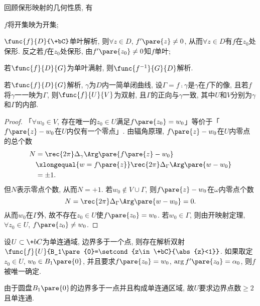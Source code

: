 \documentclass{ctexart}
\begin{document}
\begin{remark}
    回顾保形映射的几何性质, 有
    \begin{cenum}
        \item $f$将开集映为开集;
        \item $\func{f}{D}{\+bC}$单叶解析, 则$\forall z\in D$, $f'\pare{z}\neq 0$, 从而$\forall z\in D$有$f$在$z_0$处保形. 反之若$f$在$z_0$处保形, 由$f'\pare{z_0}\neq 0$知$f$单叶;
        \item 若$\func{f}{D}{G}$为单叶满射, 则$\func{f^{-1}}{G}{D}$解析.
    \end{cenum}
\end{remark}
\begin{proposition}
    若$\func{f}{D}{G}$解析, $\gamma$为$D$内一简单闭曲线, 设$\Gamma = f\comp \gamma$是$\gamma$在$f$下的像, 且若$f$将$\gamma$一一映为$\Gamma$, 则$\func{f}{U}{V}$为双射, 且$\Gamma$的正向与$\gamma$一致, 其中$U$和$V$分别为$\gamma$和$\Gamma$的内部.
\end{proposition}
\begin{figure}[ht]
    \centering
\end{figure}
\begin{proof}
    「$\forall w_0 \in V$, 存在唯一的$z_0 \in U$满足$f\pare{z_0} = w_0$」等价于「$f\pare{z} - w_0$在$U$内仅有一个零点」. 由辐角原理, $f\pare{z} - w_0$在$U$内零点的总个数
    \begin{align*}
        N &= \rec{2\pi}\Delta_\gamma \Arg\pare{f\pare{z} - w_0} \\
        &\xlongequal{w=f\pare{z}} \rec{2\pi} \Delta_\Gamma \Arg\pare{w-w_0} \\
        &= \pm 1.
    \end{align*}
    但$N$表示零点个数, 从而$N = +1$. 若$w_0\notin V\cup \Gamma$, 则$f\pare{z}  - w_0$在$\omega$内零点个数
    \[ N = \rec{2\pi} \Delta_\Gamma \Arg\pare{w-w_0} = 0. \]
    从而$w_0$在$\Gamma$外, 故不存在$z_0\in U$使$f\pare{z_0}=w_0$. 若$w_0\in \Gamma$, 则由开映射定理, $\forall z_0\in U$, $f\pare{z_0}\neq w_0$.
\end{proof}
\begin{theorem}[Riemann映射定理]
    设$U\subset \+bC$为单连通域, 边界多于一个点, 则存在解析双射$\func{f}{U}{B_1\pare{0}=\setcond{z\in\+bC}{\abs{z}<1}}$. 如果取定$z_0 \in U$, $w_0 \in B_1\pare{0}$, 并且要求$f\pare{z_0} = w_0$, $\arg f'\pare{z_0} = \alpha_0$, 则$f$被唯一确定.
\end{theorem}
\begin{remark}
    由于圆盘$B_1\pare{0}$的边界多于一点并且构成单连通区域, 故$U$要求边界点数$\ge 2$且单连通.
\end{remark}
\end{document}
